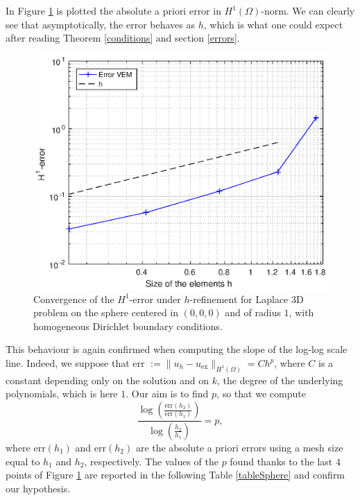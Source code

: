 In Figure \ref{img:convSphere} is plotted the absolute a priori error in $H^1(\Omega)$-norm. We can clearly see that asymptotically, the error behaves as $h$, which is what one could expect after reading Theorem \ref{conditions} and section \ref{errors}. 

\begin{figure}[!h]
\centering
\includegraphics[scale=0.8]{images/convergenceSpherePlot3D.eps}
\caption{Convergence of the $H^1$-error under $h$-refinement for Laplace 3D problem on the sphere centered in $(0,0,0)$ and of radius $1$, with homogeneous Dirichlet boundary conditions.}
\label{img:convSphere}
\end{figure}

This behaviour is again confirmed when computing the slope of the log-log scale line. Indeed, we suppose that err $:=\|u_h-u_\text{ex}\|_{H^1(\Omega)} = Ch^p$, where $C$ is a constant depending only on the solution and on $k$, the degree of the underlying polynomials, which is here $1$. Our aim is to find $p$, so that we compute 
\begin{equation}\label{ploglog}
\frac{\log\left(\frac{\text{err}(h_2)}{\text{err}(h_1)}\right)}{\log\left(\frac{h_2}{h_1}\right)}=p,
\end{equation}
where err$(h_1)$ and err$(h_2)$ are the absolute a priori errors using a mesh size equal to $h_1$ and $h_2$, respectively. The values of the $p$ found thanks to the last $4$ points of Figure \ref{img:convSphere} are reported in the following Table \ref{tableSphere} and confirm our hypothesis. \\

